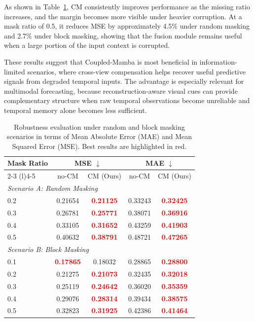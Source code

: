 \documentclass[journal]{IEEEtran}
\newcommand{\best}[1]{\textcolor{red}{\textbf{#1}}}
\begin{document}
As shown in Table~\ref{tab:missing_ablation}, CM consistently improves performance as the missing ratio increases, and the margin becomes more visible under heavier corruption. At a mask ratio of 0.5, it reduces MSE by approximately 4.5\% under random masking and 2.7\% under block masking, showing that the fusion module remains useful when a large portion of the input context is corrupted.

These results suggest that Coupled-Mamba is most beneficial in information-limited scenarios, where cross-view compensation helps recover useful predictive signals from degraded temporal inputs. The advantage is especially relevant for multimodal forecasting, because reconstruction-aware visual cues can provide complementary structure when raw temporal observations become unreliable and temporal memory alone becomes less sufficient.

\begin{table}[htb]
\renewcommand{\arraystretch}{1.1}
\caption{Robustness evaluation under random and block masking scenarios in terms of Mean Absolute Error (MAE) and Mean Squared Error (MSE). Best results are highlighted in red.}
\label{tab:missing_ablation}
\centering
\scriptsize
\setlength{\tabcolsep}{6pt}
\begin{tabular}{@{}lcccc@{}}
\toprule
\multirow{2}{*}{Mask Ratio} & \multicolumn{2}{c}{MSE $\downarrow$} & \multicolumn{2}{c}{MAE $\downarrow$} \\
\cmidrule(lr){2-3} \cmidrule(l){4-5}
 & no-CM & CM (Ours) & no-CM & CM (Ours) \\
\midrule
\multicolumn{5}{l}{\textit{Scenario A: Random Masking}} \\
\midrule
0.2 & 0.21654 & \best{0.21125} & 0.33243 & \best{0.32425} \\
0.3 & 0.26781 & \best{0.25771} & 0.38071 & \best{0.36916} \\
0.4 & 0.33105 & \best{0.31652} & 0.43259 & \best{0.41903} \\
0.5 & 0.40632 & \best{0.38791} & 0.48721 & \best{0.47265} \\
\midrule
\multicolumn{5}{l}{\textit{Scenario B: Block Masking}} \\
\midrule
0.1 & \best{0.17865} & 0.18032 & 0.28865 & \best{0.28800} \\
0.2 & 0.21275 & \best{0.21073} & 0.32435 & \best{0.32018} \\
0.3 & 0.25119 & \best{0.24642} & 0.36020 & \best{0.35359} \\
0.4 & 0.29076 & \best{0.28314} & 0.39434 & \best{0.38575} \\
0.5 & 0.32823 & \best{0.31925} & 0.42386 & \best{0.41464} \\
\bottomrule
\end{tabular}
\end{table}
\end{document}
